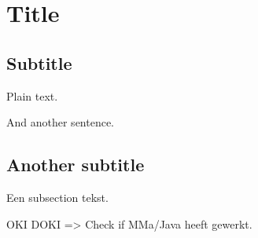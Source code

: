 \documentclass{book}
\begin{document}
\section{Title}

\subsection{Subtitle}

Plain text.

And another sentence.

\subsection{Another subtitle}

Een subsection tekst.

OKI DOKI => Check if MMa/Java heeft gewerkt. 
\end{document}
